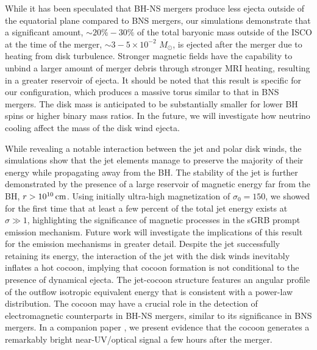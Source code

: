 \documentclass[twocolumn,dvipsnames]{aastex62}
\newcommand{\msun}{\,{M_{\odot}}}
\begin{document}
While it has been speculated that BH-NS mergers produce less ejecta outside of the equatorial plane compared to BNS mergers, our simulations demonstrate that a significant amount, $ \sim 20\%-30\% $ of the total baryonic mass outside of the ISCO at the time of the merger, $ \sim 3-5 \times 10^{-2}\,\msun $, is ejected after the merger due to heating from disk turbulence. Stronger magnetic fields have the capability to unbind a larger amount of merger debris through stronger MRI heating, resulting in a greater reservoir of ejecta. It should be noted that this result is specific for our configuration, which produces a massive torus similar to that in BNS mergers. The disk mass is anticipated to be substantially smaller for lower BH spins or higher binary mass ratios. In the future, we will investigate how neutrino cooling affect the mass of the disk wind ejecta.

While revealing a notable interaction between the jet and polar disk winds, the simulations show that the jet elements manage to preserve the majority of their energy while propagating away from the BH. The stability of the jet is further demonstrated by the presence of a large reservoir of magnetic energy far from the BH, $ r > 10^{10}\,{\rm cm}$. Using initially ultra-high magnetization of $ \sigma_0 = 150 $, we showed for the first time that at least a few percent of the total jet energy exists at $ \sigma \gg 1 $, highlighting the significance of magnetic processes in the sGRB prompt emission mechanism. Future work will investigate the implications of this result for the emission mechanisms in greater detail. Despite the jet successfully retaining its energy, the interaction of the jet with the disk winds inevitably inflates a hot cocoon, implying that cocoon formation is not conditional to the presence of dynamical ejecta. The jet-cocoon structure features an angular profile of the outflow isotropic equivalent energy that is consistent with a power-law distribution. The cocoon may have a crucial role in the detection of electromagnetic counterparts in BH-NS mergers, similar to its significance in BNS mergers. In a companion paper \citet{Gottlieb2023b}, we present evidence that the cocoon generates a remarkably bright near-UV/optical signal a few hours after the merger.
\end{document}
